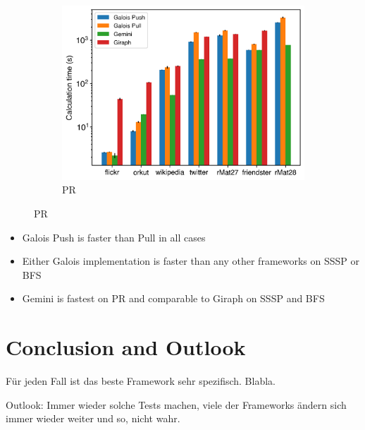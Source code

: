 \documentclass{meetings}
\begin{document}
\begin{figure}[h]
\begin{subfigure}{0.32\textwidth}
		\includegraphics[width=\linewidth]{../../plots/distributedPR_execTime.png}
		\caption{PR}
		\label{fig:distributedSSSP_exec}
	\end{subfigure}
\end{figure}
\begin{itemize}
	\item Galois Push is faster than Pull in all cases
	\item Either Galois implementation is faster than any other frameworks on SSSP or BFS
	\item Gemini is fastest on PR and comparable to Giraph on SSSP and BFS
\end{itemize}



\section{Conclusion and Outlook}
Für jeden Fall ist das beste Framework sehr spezifisch.
Blabla.

Outlook:
Immer wieder solche Tests machen, viele der Frameworks ändern sich immer wieder weiter und so, nicht wahr.
\end{document}

